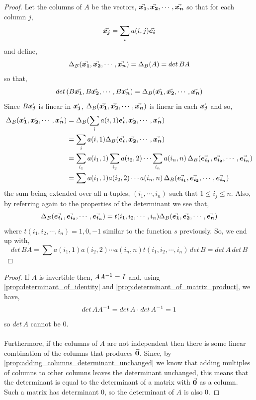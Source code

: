 \documentclass[MathsNotesBase.tex]{subfiles}
\begin{document}
{		
		\begin{proof}
			Let the columns of $A$ be the vectors, $\vec{\bm{x_1}}, \vec{\bm{x_2}}, \cdots , \vec{\bm{x_n}}$ so that for each column $j$,\\
			\[ \vec{\bm{x_j}} = \sum_{i} a(i,j)\vec{\bm{e_i}} \]
			and define,
			\[ \Delta_B(\vec{\bm{x_1}}, \vec{\bm{x_2}}, \cdots , \vec{\bm{x_n}}) = \Delta_B(A) = det\,BA \]
			so that,
			\[ det\,(B\vec{\bm{x_1}}, B\vec{\bm{x_2}}, \cdots , B\vec{\bm{x_n}}) = \Delta_B(\vec{\bm{x_1}}, \vec{\bm{x_2}}, \cdots , \vec{\bm{x_n}}) \] 
			Since $B\vec{\bm{x_j}}$ is linear in $\vec{\bm{x_j}}$, $\Delta_B(\vec{\bm{x_1}}, \vec{\bm{x_2}}, \cdots , \vec{\bm{x_n}})$ is linear in each $\vec{\bm{x_j}}$ and so,
			\begin{align*}
				\Delta_B(\vec{\bm{x_1}}, \vec{\bm{x_2}}, \cdots , \vec{\bm{x_n}}) &= \Delta_B(\sum_{i} a(i,1)\vec{\bm{e_i}}, \vec{\bm{x_2}}, \cdots , \vec{\bm{x_n}})\\
				&= \sum_{i} a(i,1)\Delta_B(\vec{\bm{e_i}}, \vec{\bm{x_2}}, \cdots , \vec{\bm{x_n}})\\
				&= \sum_{i_1} a(i_1,1)\sum_{i_2} a(i_2,2) \cdots \sum_{i_n} a(i_n,n)\,\Delta_B(\vec{\bm{e_{i_1}}}, \vec{\bm{e_{i_2}}}, \cdots , \vec{\bm{e_{i_n}}})\\
				&= \sum a(i_1,1) a(i_2,2) \cdots a(i_n,n)\,\Delta_B(\vec{\bm{e_{i_1}}}, \vec{\bm{e_{i_2}}}, \cdots , \vec{\bm{e_{i_n}}})
			\end{align*}
			the sum being extended over all n-tuples, $(i_1, \cdots , i_n)$ such that \mbox{$1 \leq i_j \leq n$}. Also, by referring again to the properties of the determinant we see that,
			\[ \Delta_B(\vec{\bm{e_{i_1}}}, \vec{\bm{e_{i_2}}}, \cdots , \vec{\bm{e_{i_n}}}) = t(i_1, i_2, \cdots , i_n)\Delta_B(\vec{\bm{e_1}}, \vec{\bm{e_2}}, \cdots , \vec{\bm{e_n}}) \]
			where $t(i_1, i_2, \cdots , i_n) = 1, 0, -1$ similar to the function $s$ previously. So, we end up with,
			\[ det\,BA = \sum a(i_1,1) a(i_2,2) \cdots a(i_n,n) t(i_1, i_2, \cdots , i_n)\,det\,B = det\,A\,det\,B \]
		\end{proof}
	
		\begin{proof}
			If $A$ is invertible then, $A{A}^{-1} = I$ and, using \autoref{prop:determinant_of_identity} and \autoref{prop:determinant_of_matrix_product}, we have,
			\[ det\,A{A}^{-1} = det\,A \cdot det\,{A}^{-1} = 1 \]
			so $det\,A$ cannot be $0$.
			\paragraph{} Furthermore, if the columns of $A$ are not independent then there is some linear combination of the columns that produces $\vec{\bm{0}}$. Since, by \autoref{prop:adding_columns_determinant_unchanged} we know that adding multiples of columns to other columns leaves the determinant unchanged, this means that the determinant is equal to the determinant of a matrix with $\vec{\bm{0}}$ as a column. Such a matrix has determinant 0, so the determinant of $A$ is also 0.
		\end{proof}
	
}
\end{document}
